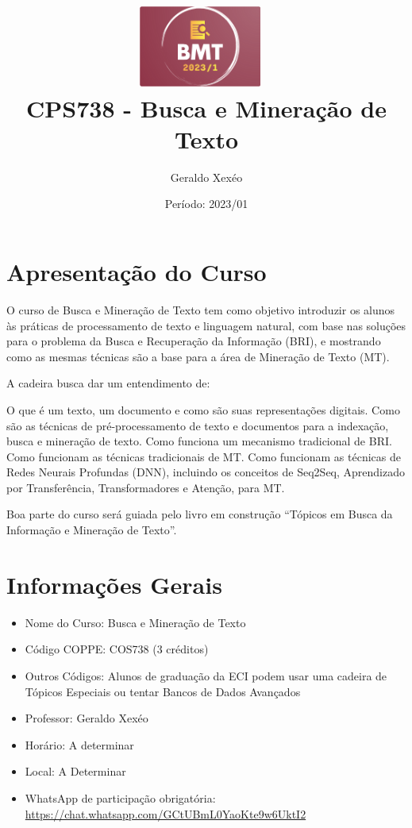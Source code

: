 \documentclass{article}
\title{\includegraphics[width=0.3\textwidth]{images/logobmt.png}~ 
\\[1cm]
CPS738 - Busca e Mineração de Texto}
\author{Geraldo Xexéo}
\date{Período: 2023/01}
\begin{document}
\maketitle

\section{Apresentação do Curso}

O curso de Busca e Mineração de Texto tem como objetivo introduzir os alunos às práticas de processamento de texto e linguagem natural, com base nas soluções para o  problema da Busca e Recuperação da Informação (BRI), e mostrando como as mesmas técnicas são a base para a área de Mineração de Texto (MT).

A cadeira busca dar um entendimento de:
\begin{outline}
\1 O que é um texto, um documento e como são suas representações digitais.
\1 Como são as técnicas de pré-processamento de texto e documentos para a indexação, busca e mineração de texto.
\1 Como funciona um mecanismo tradicional de BRI.
\1 Como funcionam as técnicas tradicionais de MT.
\1 Como funcionam as técnicas de Redes Neurais Profundas (DNN), incluindo os conceitos de Seq2Seq, Aprendizado por Transferência, Transformadores e Atenção, para MT.
\end{outline}

Boa parte do curso será guiada pelo livro em construção ``Tópicos em Busca da Informação e Mineração de Texto''. 

\section{Informações Gerais}
\begin{itemize}
    \item Nome do Curso: Busca e Mineração de Texto
    \item Código COPPE: COS738 (3 créditos)
    \item Outros Códigos: Alunos de graduação da ECI podem usar uma cadeira de Tópicos Especiais ou tentar Bancos de Dados Avançados
    \item Professor: Geraldo Xexéo
    \item Horário: A determinar
    \item Local: A Determinar
    \item WhatsApp de participação obrigatória: \url{https://chat.whatsapp.com/GCtUBmL0YaoKte9w6UktI2}
\end{itemize}
\end{document}
